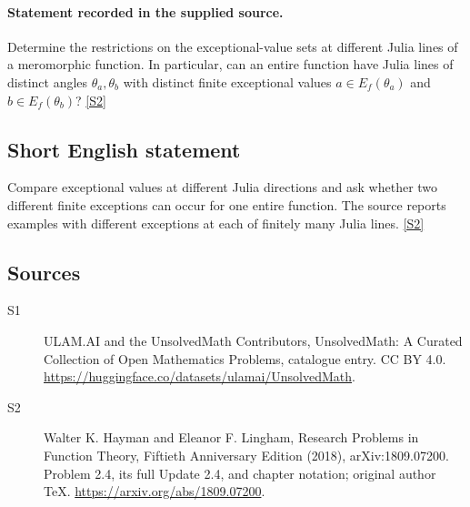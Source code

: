 \documentclass[11pt]{article}
\newcommand{\sref}[2]{\hyperlink{source:#1:#2}{[S#2]}}
\begin{document}
\paragraph{Statement recorded in the supplied source.}
Determine the restrictions on the exceptional-value sets at different Julia lines of a meromorphic function. In particular, can an entire function have Julia lines of distinct angles $\theta_a,\theta_b$ with distinct finite exceptional values $a\in E_f(\theta_a)$ and $b\in E_f(\theta_b)$? \sref{statement}{2}
\subsection{Short English statement}
Compare exceptional values at different Julia directions and ask whether two different finite exceptions can occur for one entire function. The source reports examples with different exceptions at each of finitely many Julia lines. \sref{statement}{2}
\subsection{Sources}
\begin{description}
\item[\hypertarget{source:statement:1}{S1}] ULAM.AI and the UnsolvedMath Contributors, UnsolvedMath: A Curated Collection of Open Mathematics Problems, catalogue entry. CC BY 4.0. \url{https://huggingface.co/datasets/ulamai/UnsolvedMath}.
\item[\hypertarget{source:statement:2}{S2}] Walter K. Hayman and Eleanor F. Lingham, Research Problems in Function Theory, Fiftieth Anniversary Edition (2018), arXiv:1809.07200. Problem 2.4, its full Update 2.4, and chapter notation; original author TeX. \url{https://arxiv.org/abs/1809.07200}.
\end{description}
\label{end:statement}
\end{document}
